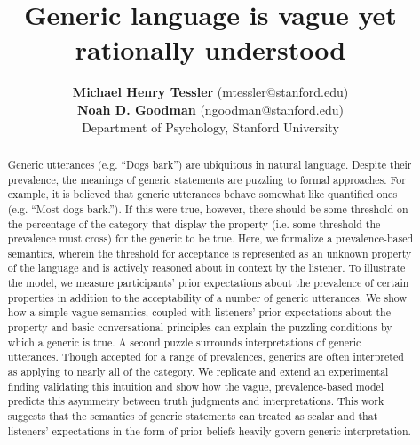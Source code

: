 \documentclass[10pt,letterpaper]{article}
\title{Generic language is vague yet rationally understood}
\author{{\large \bf Michael Henry Tessler} (mtessler@stanford.edu)\\ {\large \bf Noah D. Goodman} (ngoodman@stanford.edu) \\
  Department of Psychology, Stanford University}
\begin{document}
\maketitle


\begin{abstract}
Generic utterances (e.g. ``Dogs bark'') are ubiquitous in natural language. Despite their prevalence, the meanings of generic statements are puzzling to formal approaches. 
For example, it is believed that generic utterances behave somewhat like quantified ones (e.g. ``Most dogs bark.''). If this were true, however, there should be some threshold on the percentage of the category that display the property (i.e. some threshold the prevalence must cross) for the generic to be true.
Here, we formalize a prevalence-based semantics, wherein the threshold for acceptance is represented as an unknown property of the language and is actively reasoned about in context by the listener. 
To illustrate the model, we measure participants' prior expectations about the prevalence of certain properties in addition to the acceptability of a number of generic utterances. 
We show %
how a simple vague semantics, coupled with listeners' prior expectations about the property and basic conversational principles can explain the puzzling conditions by which a generic is true.
A second puzzle surrounds interpretations of generic utterances. Though accepted for a range of prevalences,  generics are often interpreted as applying to nearly all of the category. 
We replicate and extend an experimental finding validating this intuition and show how the vague, prevalence-based model predicts this asymmetry between truth judgments and interpretations. 
This work suggests that the semantics of generic statements can treated as scalar and that listeners' expectations in the form of prior beliefs heavily govern generic interpretation. 


\end{abstract}
\end{document}
